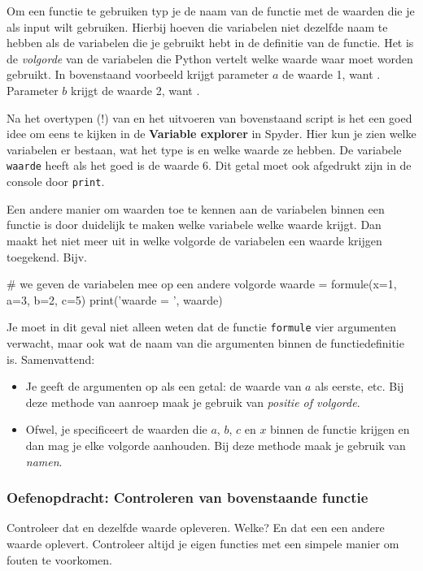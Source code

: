 \documentclass[a4paper,11pt, fleqn]{article}
\begin{document}
Om een functie te gebruiken typ je de naam van de functie met de waarden die je als input wilt gebruiken. Hierbij hoeven die variabelen niet dezelfde naam te hebben als de variabelen die je gebruikt hebt in de definitie van de functie. Het is de \textit{volgorde} van de variabelen die Python vertelt welke waarde waar moet worden gebruikt. 
In bovenstaand voorbeeld krijgt parameter $a$ de waarde 1, want . Parameter $b$ krijgt de waarde 2, want .

Na het overtypen (!) van en het uitvoeren van bovenstaand script is het een goed idee om eens te kijken in de \textbf{Variable explorer} in Spyder. Hier kun je zien welke variabelen er bestaan, wat het type is en welke waarde ze hebben. De variabele \verb, waarde, heeft als het goed is de waarde 6. Dit getal moet ook afgedrukt zijn in de console door \verb,print,.

Een andere manier om waarden toe te kennen aan de variabelen binnen een functie is door duidelijk te maken welke variabele welke waarde krijgt. Dan maakt het niet meer uit in welke volgorde de variabelen een waarde krijgen toegekend. Bijv.

\begin{python}
# we geven de variabelen mee op een andere volgorde
waarde = formule(x=1, a=3, b=2, c=5) 
print('waarde = ', waarde)
\end{python}

Je moet in dit geval niet alleen weten dat de functie \verb,formule, vier argumenten verwacht, maar ook wat de naam van die argumenten binnen de functiedefinitie is. Samenvattend:
\begin{itemize}
\item Je geeft de argumenten op als een getal: de waarde van $a$ als eerste, etc.
Bij deze methode van aanroep maak je gebruik van \textit{positie of volgorde}.

\item Ofwel, je specificeert de waarden die $a$, $b$, $c$ en $x$ binnen de functie krijgen en dan mag je elke volgorde aanhouden. Bij deze methode maak je gebruik van \textit{namen}.
\end{itemize}

\subsubsection*{Oefenopdracht: Controleren van bovenstaande functie}
Controleer dat  en   dezelfde waarde opleveren. Welke? En dat een  een andere waarde oplevert. Controleer altijd je eigen functies met een simpele manier om fouten te voorkomen.
\end{document}
